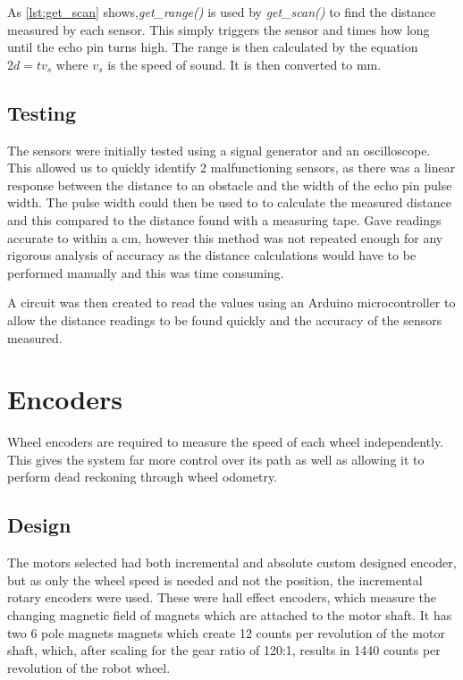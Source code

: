 As \ref{lst:get_scan} shows,\textit{get\_range()} is used by \textit{get\_scan()} to find the distance measured by each sensor. This simply triggers the sensor and times how long until the echo pin turns high. The range is then calculated by the equation $ 2d = tv_s$ where $v_s$ is the speed of sound. It is then converted to mm.

\subsection{Testing}\label{elec/range/test}
The sensors were initially tested using a signal generator and an oscilloscope. This allowed us to quickly identify 2 malfunctioning sensors, as there was a linear response between the distance to an obstacle and the width of the echo pin pulse width. The pulse width could then be used to to calculate the measured distance and this compared to the distance found with a measuring tape. Gave readings accurate to within a cm, however this method  was not repeated enough for any rigorous analysis of accuracy as the distance calculations would have to be performed manually and this was time consuming. 

A circuit was then created to read the values using an Arduino microcontroller to allow the distance readings to be found quickly and the accuracy of the sensors measured.





\section{Encoders}\label{elec/encoder}
Wheel encoders are required to measure the speed of each wheel independently. This gives the system far more control over its path as well as allowing it to perform dead reckoning through wheel odometry. 
\subsection{Design}\label{elec/encoder/design}
 The motors selected had both incremental and absolute custom designed encoder, but as only the wheel speed is needed and not the position, the incremental rotary encoders were used. These were hall effect encoders, which measure the changing magnetic field of magnets which are attached to the motor shaft. It has two 6 pole magnets magnets which create 12 counts per revolution of the motor shaft, which, after scaling for the gear ratio of 120:1, results in 1440 counts per revolution of the robot wheel. 
 
